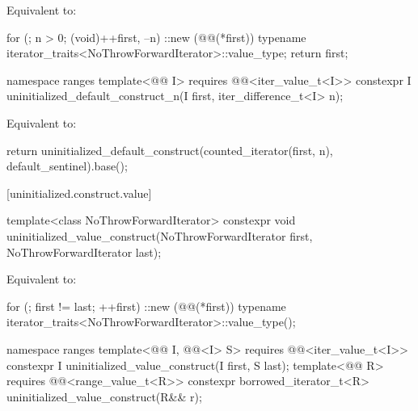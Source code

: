 \begin{itemdescr}
\pnum
\effects
Equivalent to:
\begin{codeblock}
for (; n > 0; (void)++first, --n)
  ::new (@@(*first))
    typename iterator_traits<NoThrowForwardIterator>::value_type;
return first;
\end{codeblock}
\end{itemdescr}

%
\begin{itemdecl}
namespace ranges {
  template<@@ I>
    requires @@<iter_value_t<I>>
    constexpr I uninitialized_default_construct_n(I first, iter_difference_t<I> n);
}
\end{itemdecl}

\begin{itemdescr}
\pnum
\effects
Equivalent to:
\begin{codeblock}
return uninitialized_default_construct(counted_iterator(first, n),
                                       default_sentinel).base();
\end{codeblock}
\end{itemdescr}

[uninitialized.construct.value]{}

%
\begin{itemdecl}
template<class NoThrowForwardIterator>
  constexpr void uninitialized_value_construct(NoThrowForwardIterator first,
                                               NoThrowForwardIterator last);
\end{itemdecl}

\begin{itemdescr}
\pnum
\effects
Equivalent to:
\begin{codeblock}
for (; first != last; ++first)
  ::new (@@(*first))
    typename iterator_traits<NoThrowForwardIterator>::value_type();
\end{codeblock}
\end{itemdescr}

%
\begin{itemdecl}
namespace ranges {
  template<@@ I, @@<I> S>
    requires @@<iter_value_t<I>>
    constexpr I uninitialized_value_construct(I first, S last);
  template<@@ R>
    requires @@<range_value_t<R>>
    constexpr borrowed_iterator_t<R> uninitialized_value_construct(R&& r);
}
\end{itemdecl}


